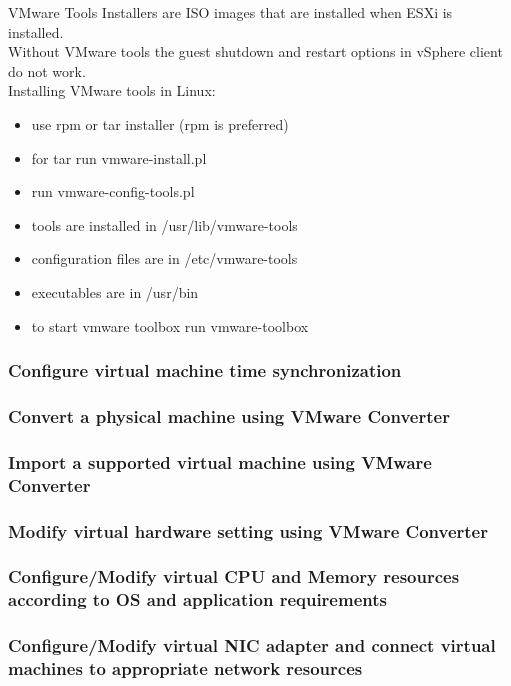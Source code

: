 VMware Tools Installers are ISO images that are installed when ESXi is
installed.\\

Without VMware tools the guest shutdown and restart options in vSphere client
do not work.\\

Installing VMware tools in Linux:

\begin{itemize}
\item use rpm or tar installer (rpm is preferred)
\item for tar run vmware-install.pl
\item run vmware-config-tools.pl
\item tools are installed in /usr/lib/vmware-tools
\item configuration files are in /etc/vmware-tools
\item executables are in /usr/bin
\item to start vmware toolbox run vmware-toolbox
\end{itemize}

\subsubsection{Configure virtual machine time synchronization}

\subsubsection{Convert a physical machine using VMware Converter}

\subsubsection{Import a supported virtual machine using VMware Converter}

\subsubsection{Modify virtual hardware setting using VMware Converter}

\subsubsection{Configure/Modify virtual CPU and Memory resources according to OS and application requirements}

\subsubsection{Configure/Modify virtual NIC adapter and connect virtual machines to appropriate network resources}

